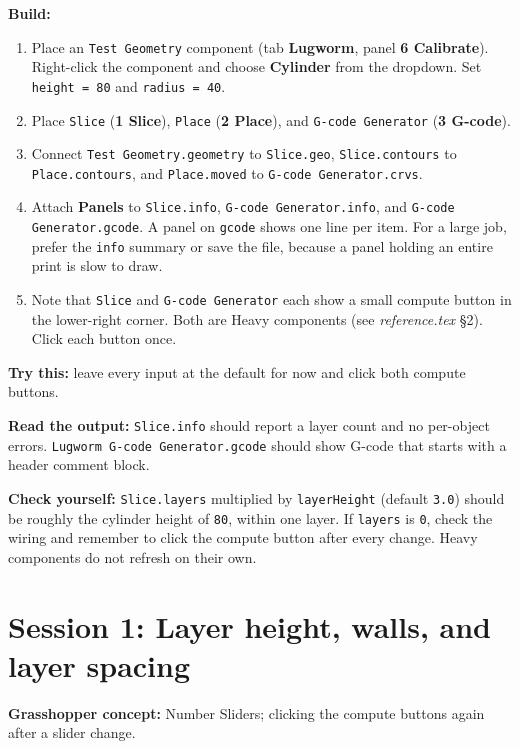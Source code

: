 \documentclass[11pt]{article}
\newcommand{\param}[1]{\texttt{#1}}
\newcommand{\exlabel}[1]{\par\vspace{0.3em}\noindent\textbf{#1:}\enspace}
\begin{document}
\exlabel{Build}
\begin{enumerate}
  \item Place an \param{Test Geometry} component (tab \textbf{Lugworm}, panel \textbf{6 Calibrate}). Right-click the component and choose \textbf{Cylinder} from the dropdown. Set \param{height = 80} and \param{radius = 40}.
  \item Place \param{Slice} (\textbf{1 Slice}), \param{Place} (\textbf{2 Place}), and \param{G-code Generator} (\textbf{3 G-code}).
  \item Connect \param{Test Geometry.geometry} to \param{Slice.geo}, \param{Slice.contours} to \param{Place.contours}, and \param{Place.moved} to \param{G-code Generator.crvs}.
  \item Attach \textbf{Panels} to \param{Slice.info}, \param{G-code Generator.info}, and \param{G-code Generator.gcode}. A panel on \param{gcode} shows one line per item. For a large job, prefer the \param{info} summary or save the file, because a panel holding an entire print is slow to draw.
  \item Note that \param{Slice} and \param{G-code Generator} each show a small compute button in the lower-right corner. Both are Heavy components (see \emph{reference.tex} \S 2). Click each button once.
\end{enumerate}

\exlabel{Try this} leave every input at the default for now and click
both compute buttons.

\exlabel{Read the output} \param{Slice.info} should report a
layer count and no per-object errors. \param{Lugworm G-code
Generator.gcode} should show G-code that starts with a header comment
block.

\exlabel{Check yourself} \param{Slice.layers} multiplied by
\param{layerHeight} (default \param{3.0}) should be roughly the
cylinder height of \param{80}, within one layer. If \param{layers} is
\param{0}, check the wiring and remember to click the compute button
after every change. Heavy components do not refresh on their own.

\section{Session 1: Layer height, walls, and layer spacing}

\exlabel{Grasshopper concept} Number Sliders; clicking the compute
buttons again after a slider change.
\end{document}
